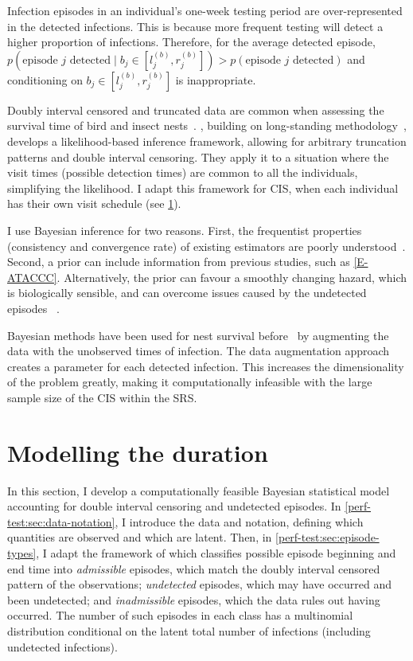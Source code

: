 \documentclass[thesis.tex]{subfiles}
\begin{document}
Infection episodes in an individual's one-week testing period are over-represented in the detected infections.
This is because more frequent testing will detect a higher proportion of infections.
Therefore, for the average detected episode, $p(\text{episode $j$ detected} \mid b_j \in [l_j^{(b)}, r_j^{(b)}]) > p(\text{episode $j$ detected})$ and conditioning on $b_j \in [l_j^{(b)}, r_j^{(b)}]$ is inappropriate.

Doubly interval censored and truncated data are common when assessing the survival time of bird and insect nests~\autocite{heiseyABCs}.
\textcite{heiseyModelling}, building on long-standing methodology~\autocite{dempsterMaximum,turnbullEmpirical}, develops a likelihood-based inference framework, allowing for arbitrary truncation patterns and double interval censoring.
They apply it to a situation where the visit times (possible detection times) are common to all the individuals, simplifying the likelihood.
I adapt this framework for CIS, when each individual has their own visit schedule (see \cref{perf-test:sec:model}).

I use Bayesian inference for two reasons.
First, the frequentist properties (\eg consistency and convergence rate) of existing estimators are poorly understood~\autocite{sunAnalysis,dengNonparametric}.
Second, a prior can include information from previous studies, such as \cref{E-ATACCC}.
Alternatively, the prior can favour a smoothly changing hazard, which is biologically sensible, and can overcome issues caused by the undetected episodes ~\autocite{caoBias}.

Bayesian methods have been used for nest survival before~\autocite{heBayesiana,heBayesian,caoModeling} by augmenting the data with the unobserved times of infection.
The data augmentation approach creates a parameter for each detected infection.
This increases the dimensionality of the problem greatly, making it computationally infeasible with the large sample size of the CIS within the SRS.


\section{Modelling the duration}\label{perf-test:sec:model}

In this section, I develop a computationally feasible Bayesian statistical model accounting for double interval censoring and undetected episodes.
In \cref{perf-test:sec:data-notation}, I introduce the data and notation, defining which quantities are observed and which are latent.
Then, in \cref{perf-test:sec:episode-types}, I adapt the framework of \textcite{heiseyModelling} which classifies possible episode beginning and end time into \emph{admissible} episodes, which match the doubly interval censored pattern of the observations; \emph{undetected} episodes, which may have occurred and been undetected; and \emph{inadmissible} episodes, which the data rules out having occurred.
The number of such episodes in each class has a multinomial distribution conditional on the latent total number of infections (including undetected infections).
\end{document}
